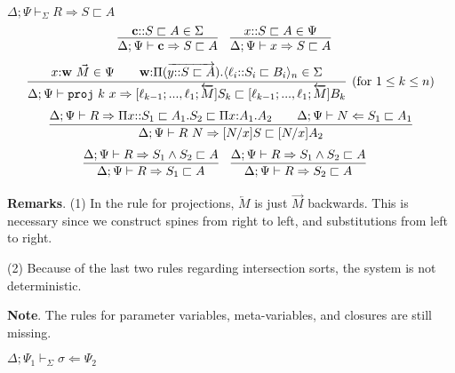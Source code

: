 \documentclass[letterpaper, 11pt]{article}
\newcommand{\Rar}{\Rightarrow}
\newcommand{\Lar}{\Leftarrow}
\newcommand{\proj}{\texttt{proj}}
\begin{document}
    $\boxed{ \Delta; \Psi \vdash_\Sigma R \Rar S \sqsubset A}$
    \begin{align*}
      & \infer{\Delta; \Psi \vdash \textbf{c} \Rar S \sqsubset A}
        {
          \textbf{c} {::} S \sqsubset A \in \Sigma
        } &
      & \infer{\Delta; \Psi \vdash x \Rar S \sqsubset A}
        {
          x {::} S \sqsubset A \in \Psi
        } 
    \end{align*}
    \begin{align*}
      \infer[(\text{for } 1 \leq k \leq n)]
            {\Delta; \Psi \vdash \proj \ k \ x \Rar [\ell_{k-1}; ..., \ell_1; \overleftarrow{M}]S_k \sqsubset [\ell_{k-1}; ..., \ell_1; \overleftarrow{M}] B_k}
            {
              x {:} \textbf{w} \ \vec{M} \in \Psi
              &&
              \textbf{w} {:} \Pi (\overrightarrow{y {::} S \sqsubset A}). \langle \ell_i {::} S_i \sqsubset B_i \rangle_n \in \Sigma
            }
    \end{align*}
    \begin{align*}
      \infer{\Delta; \Psi \vdash R \ N \Rar [N/x]S \sqsubset [N/x]A_2}
            {
              \Delta; \Psi \vdash R \Rar \Pi x{::}S_1 \sqsubset A_1. S_2 \sqsubset \Pi x{:}A_1. A_2
              &&
              \Delta; \Psi \vdash N \Lar S_1 \sqsubset A_1
            }
    \end{align*}
    \begin{align*}
      & \infer{\Delta; \Psi \vdash R \Rar S_1 \sqsubset A}
              {\Delta; \Psi \vdash R \Rar S_1 \land S_2 \sqsubset A} &
      & \infer{\Delta; \Psi \vdash R \Rar S_2 \sqsubset A}
              {\Delta; \Psi \vdash R \Rar S_1 \land S_2 \sqsubset A}
    \end{align*}
    
    \textbf{Remarks}. (1) In the rule for projections, $\overleftarrow{M}$ is just $\vec{M}$ backwards.  This is necessary since we construct spines
    from right to left, and substitutions from left to right.

    (2) Because of the last two rules regarding intersection sorts, the system is not deterministic.

    \textbf{Note}.  The rules for parameter variables, meta-variables, and closures are still missing.  

    $\boxed{ \Delta; \Psi_1 \vdash_\Sigma \sigma \Lar \Psi_2}$
\end{document}
